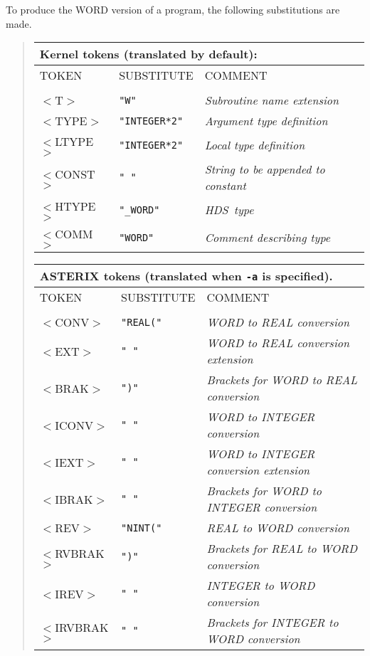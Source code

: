 \documentclass[twoside,11pt,nolof]{starlink}
\providecommand{\HDS}{{\footnotesize HDS}\normalsize}
\begin{document}
To produce the WORD version of a program, the following substitutions
are made.
\begin{quote}
\begin{tabular}{lll}
\multicolumn{3}{l}{\bf{Kernel} tokens (translated by default):}\\
\hline
TOKEN      &SUBSTITUTE     &COMMENT\\
\\
$<$T$>$     &\texttt{"W"}         &\emph{Subroutine name extension}\\
$<$TYPE$>$  &\texttt{"INTEGER*2"} &\emph{Argument type definition}\\
$<$LTYPE$>$ &\texttt{"INTEGER*2"} &\emph{Local type definition}\\
$<$CONST$>$ &\texttt{" "}         &\emph{String to be appended to constant}\\
$<$HTYPE$>$ &\texttt{"\_WORD"}    &\emph{\HDS\ type}\\
$<$COMM$>$  &\texttt{"WORD"}      &\emph{Comment describing type}\\
\end{tabular}

\begin{tabular}{lll}
\multicolumn{3}{l}{\bf{ASTERIX} tokens (translated when \texttt{-a} is specified).}\\
\hline
TOKEN      &SUBSTITUTE      &COMMENT\\
\\
$<$CONV$>$     &\texttt{"REAL("} &\emph{WORD to REAL conversion}\\
$<$EXT$>$      &\texttt{" "}     &\emph{WORD to REAL conversion extension}\\
$<$BRAK$>$     &\texttt{")"}   &\emph{Brackets for WORD to REAL conversion}\\
$<$ICONV$>$    &\texttt{" "}     &\emph{WORD to INTEGER conversion}\\
$<$IEXT$>$     &\texttt{" "}   &\emph{WORD to INTEGER conversion extension}\\
$<$IBRAK$>$    &\texttt{" "} &\emph{Brackets for WORD to INTEGER conversion}\\
$<$REV$>$      &\texttt{"NINT("} &\emph{REAL to WORD conversion}\\
$<$RVBRAK$>$   &\texttt{")"}  &\emph{Brackets for REAL to WORD conversion}\\
$<$IREV$>$     &\texttt{" "}     &\emph{INTEGER to WORD conversion}\\
$<$IRVBRAK$>$  &\texttt{" "} &\emph{Brackets for INTEGER to WORD conversion}\\
\end{tabular}
\end{quote}
\end{document}
